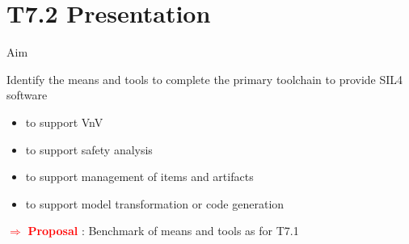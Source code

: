 

\section{T7.2 Presentation}

\begin{frame}{Aim}

Identify the means and tools to complete the primary toolchain to provide SIL4 software
  \begin{itemize}
  \item
    to  support VnV 
  \item
    to  support safety analysis
  \item 
  	to  support management of items and artifacts
  \item
  	to support model transformation or code generation
  \end{itemize}
  
  
\pause   
   
  \textcolor{red}{$ \Rightarrow $ \bf{Proposal} } :
   Benchmark of means and tools as for T7.1

\end{frame}


